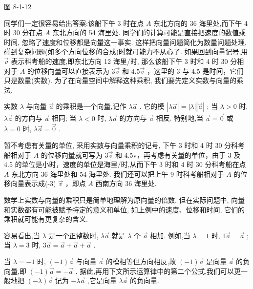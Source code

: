 \documentclass[10pt]{article}
\begin{document}
图 8-1-12

同学们一定很容易给出答案:该船下午 3 时在点 \(A\) 东北方向的 36 海里处,而下午 4 时 30 分在点 \(A\) 东北方向的 54 海里处. 同学们的计算可能是直接把速度的数值乘时间, 忽略了速度和位移都是向量这一事实. 这样把向量问题简化为数量问题处理, 碰到复杂问题(如多个方向位移的合成)时就可能力不从心了. 如果回到向量记号,用 \(\overrightarrow{v}\) 表示科考船的速度,即东北方向 12 海里/时, 那么该船下午 3 时和 4 时 30 分相对于 \(A\) 的位移向量可以直接表示为 \(3\overrightarrow{v}\) 和 \({4.5}\overrightarrow{v}\) ，这里的 3 与 4.5 是时间，它们只是数量(实数). 为了在向量空间中解释这种乘积, 我们要先定义实数与向量的乘法.

实数 \(\lambda\) 与向量 \(\overrightarrow{a}\) 的乘积是一个向量,记作 \(\lambda \overrightarrow{a}\) . 它的模 \(\left| {\lambda \overrightarrow{a}}\right|  = \left| \lambda \right| \left| \overrightarrow{a}\right|\) ; 当 \(\lambda  > 0\) 时, \(\lambda \overrightarrow{a}\) 的方向与 \(\overrightarrow{a}\) 相同; 当 \(\lambda  < 0\) 时, \(\lambda \overrightarrow{a}\) 的方向与 \(\overrightarrow{a}\) 相反. 特别地,当 \(\overrightarrow{a} = \overrightarrow{0}\) 或 \(\lambda  = 0\) 时, \(\lambda \overrightarrow{a} = \overrightarrow{0}\) .

暂不考虑有关量的单位, 采用实数与向量乘积的记号, 下午 3 时和 4 时 30 分科考船相对于 \(A\) 的位移向量就可写为 \(3\overrightarrow{v}\) 和 4.5v，再考虑有关量的单位，由于 3 及 4.5 的单位是小时，速度的单位是海里/时,从而下午 3 时和 4 时 30 分科考船在点 \(A\) 东北方向 36 海里处和 54 海里处. 我们还可以把上午 9 时科考船相对于 \(A\) 的位移向量表示成(-3) \(\overrightarrow{v}\) ，即点 \(A\) 西南方向 36 海里处.

数学上实数与向量的乘积只是简单地理解为原向量的倍数. 但在实际问题中, 向量和实数都有可能被赋予特定的意义和单位, 如上例中的速度、位移和时间, 它们的乘积就可能有更复杂的含义.

容易看出,当 \(\lambda\) 是一个正整数时, \(\lambda \overrightarrow{a}\) 就是 \(\lambda\) 个 \(\overrightarrow{a}\) 相加. 例如,当 \(\lambda  = 1\) 时, \(1\overrightarrow{a} = \overrightarrow{a}\) ; 当 \(\lambda  = 3\) 时, \(3\overrightarrow{a} = \overrightarrow{a} + \overrightarrow{a} + \overrightarrow{a}\) .

当 \(\lambda  =  - 1\) 时, \(\left( {-1}\right) \overrightarrow{a}\) 与向量 \(\overrightarrow{a}\) 的模相等但方向相反,故 \(\left( {-1}\right) \overrightarrow{a}\) 是向量 \(\overrightarrow{a}\) 的负向量,即 \(\left( {-1}\right) \overrightarrow{a} =  - \overrightarrow{a}\) . 据此,再用下文所示运算律中的第二个公式,我们可以更一般地把 \(\left( {-\lambda }\right) \overrightarrow{a}\) 记为 \(- \lambda \overrightarrow{a}\) ,它是向量 \(\lambda \overrightarrow{a}\) 的负向量.
\end{document}
